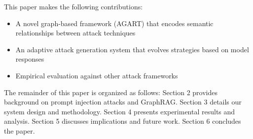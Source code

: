 This paper makes the following contributions:
\begin{itemize}
\item A novel graph-based framework (AGART) that encodes semantic relationships between attack techniques
\item An adaptive attack generation system that evolves strategies based on model responses
\item Empirical evaluation against other attack frameworks
\end{itemize}

The remainder of this paper is organized as follows: Section 2 provides background on prompt injection attacks and GraphRAG. Section 3 details our system design and methodology. Section 4 presents experimental results and analysis. Section 5 discusses implications and future work. Section 6 concludes the paper. 
